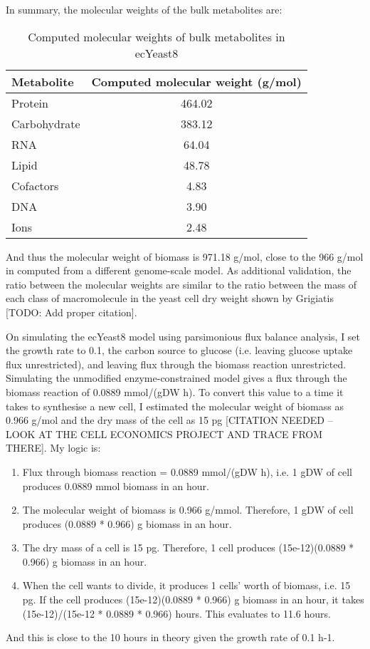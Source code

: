 In summary, the molecular weights of the bulk metabolites are:
\begin{table}[ht]
  \centering
  \begin{tabular}{lS}
    Metabolite & {Computed molecular weight (g/mol)} \\
    \hline
    Protein & 464.02 \\
    Carbohydrate & 383.12 \\
    RNA & 64.04 \\
    Lipid & 48.78 \\
    Cofactors & 4.83 \\
    DNA & 3.90 \\
    Ions & 2.48
  \end{tabular}
  \caption{Computed molecular weights of bulk metabolites in ecYeast8}
  \label{tab:ecyeast8-mol-weights}
\end{table}

And thus the molecular weight of biomass is 971.18 g/mol, close to the 966 g/mol in \textcite{takhaveevTemporalSegregationBiosynthetic2023} computed from a different genome-scale model.
As additional validation, the ratio between the molecular weights are similar to the ratio between the mass of each class of macromolecule in the yeast cell dry weight shown by Grigiatis [TODO: Add proper citation].

On simulating the ecYeast8 model using parsimonious flux balance analysis, I set the growth rate to 0.1, the carbon source to glucose (i.e. leaving glucose uptake flux unrestricted), and leaving flux through the biomass reaction unrestricted.
Simulating the unmodified enzyme-constrained model gives a flux through the biomass reaction of 0.0889 mmol/(gDW h).
To convert this value to a time it takes to synthesise a new cell, I estimated the molecular weight of biomass as 0.966 g/mol \parencite{takhaveevTemporalSegregationBiosynthetic2023} and the dry mass of the cell as 15 pg [CITATION NEEDED -- LOOK AT THE CELL ECONOMICS PROJECT AND TRACE FROM THERE].
My logic is:
\begin{enumerate}
   \item Flux through biomass reaction = 0.0889 mmol/(gDW h), i.e. 1 gDW of cell produces 0.0889 mmol biomass in an hour.
   \item The molecular weight of biomass is 0.966 g/mmol.  Therefore, 1 gDW of cell produces (0.0889 * 0.966) g biomass in an hour.
   \item The dry mass of a cell is 15 pg.  Therefore, 1 cell produces (15e-12)(0.0889 * 0.966) g biomass in an hour.
   \item When the cell wants to divide, it produces 1 cells' worth of biomass, i.e. 15 pg.  If the cell produces (15e-12)(0.0889 * 0.966) g biomass in an hour, it takes (15e-12)/(15e-12 * 0.0889 * 0.966) hours.  This evaluates to 11.6 hours.
\end{enumerate}
And this is close to the 10 hours in theory given the growth rate of 0.1 h-1.

